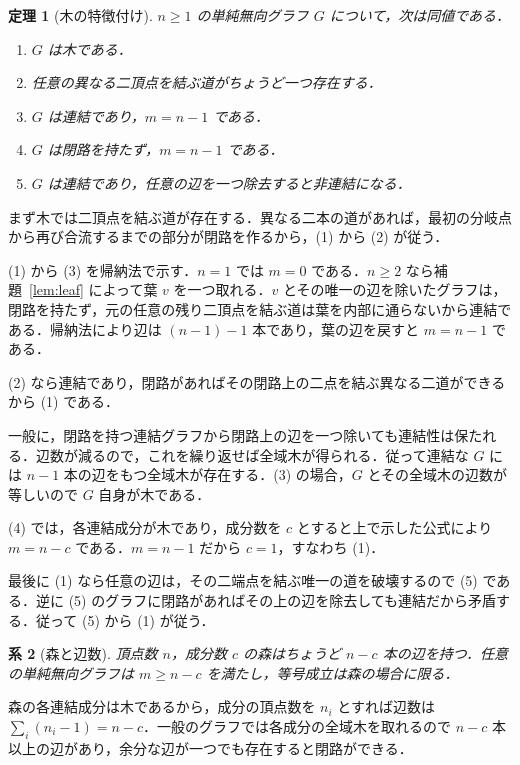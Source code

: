 \documentclass[a5paper,10pt,onecolumn]{jsarticle}
\makeatletter
\theoremstyle{mathnotetheorem}
\newtheorem{theorem}{定理}[section]
\newtheorem{corollary}[theorem]{系}
\renewcommand{\proofname}{証明}
\renewenvironment{proof}[1][\proofname]{%
  \par\pushQED{\qed}\normalfont\topsep4\p@\@plus2\p@\relax
  \trivlist\item[\hskip\labelsep\bfseries #1]\ignorespaces
}{\popQED\endtrivlist\@endpefalse}
\makeatother
\begin{document}
\begin{theorem}[木の特徴付け]\label{thm:treeequiv}
$n\ge1$ の単純無向グラフ $G$ について，次は同値である．
\begin{enumerate}
\item $G$ は木である．
\item 任意の異なる二頂点を結ぶ道がちょうど一つ存在する．
\item $G$ は連結であり，$m=n-1$ である．
\item $G$ は閉路を持たず，$m=n-1$ である．
\item $G$ は連結であり，任意の辺を一つ除去すると非連結になる．
\end{enumerate}
\end{theorem}
\begin{proof}
まず木では二頂点を結ぶ道が存在する．異なる二本の道があれば，最初の分岐点から再び合流するまでの部分が閉路を作るから，(1) から (2) が従う．

(1) から (3) を帰納法で示す．$n=1$ では $m=0$ である．$n\ge2$ なら補題~\ref{lem:leaf} によって葉 $v$ を一つ取れる．$v$ とその唯一の辺を除いたグラフは，閉路を持たず，元の任意の残り二頂点を結ぶ道は葉を内部に通らないから連結である．帰納法により辺は $(n-1)-1$ 本であり，葉の辺を戻すと $m=n-1$ である．

(2) なら連結であり，閉路があればその閉路上の二点を結ぶ異なる二道ができるから (1) である．

一般に，閉路を持つ連結グラフから閉路上の辺を一つ除いても連結性は保たれる．辺数が減るので，これを繰り返せば全域木が得られる．従って連結な $G$ には $n-1$ 本の辺をもつ全域木が存在する．(3) の場合，$G$ とその全域木の辺数が等しいので $G$ 自身が木である．

(4) では，各連結成分が木であり，成分数を $c$ とすると上で示した公式により $m=n-c$ である．$m=n-1$ だから $c=1$，すなわち (1)．

最後に (1) なら任意の辺は，その二端点を結ぶ唯一の道を破壊するので (5) である．逆に (5) のグラフに閉路があればその上の辺を除去しても連結だから矛盾する．従って (5) から (1) が従う．
\end{proof}

\begin{corollary}[森と辺数]\label{cor:forest}
頂点数 $n$，成分数 $c$ の森はちょうど $n-c$ 本の辺を持つ．任意の単純無向グラフは $m\ge n-c$ を満たし，等号成立は森の場合に限る．
\end{corollary}
\begin{proof}
森の各連結成分は木であるから，成分の頂点数を $n_i$ とすれば辺数は $\sum_i(n_i-1)=n-c$．一般のグラフでは各成分の全域木を取れるので $n-c$ 本以上の辺があり，余分な辺が一つでも存在すると閉路ができる．
\end{proof}
\end{document}

